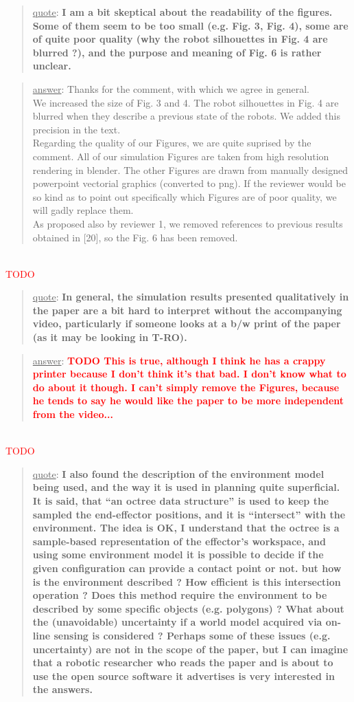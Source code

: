 \documentclass[a4paper]{article}
\newcommand{\ndone}[0]{\textcolor{red}{TODO}}
\newcommand\quot[1]{\begin{quote} \underline{quote}: \textbf{#1}\end{quote}}
\newcommand\as[1]{\begin{quote} \underline{answer}: {#1}\end{quote} \leavevmode \\ }
\begin{document}
\quot{I am a bit skeptical about the readability of the figures. Some of them seem to be too small (e.g. Fig. 3, Fig. 4), some are of quite poor quality (why the robot silhouettes in Fig. 4 are blurred ?), and the purpose and meaning of Fig. 6 is rather unclear.}
\as{Thanks for the comment, with which we agree in general.  \\We increased the size of Fig. 3 and 4. The robot silhouettes in Fig. 4 are blurred when they describe a previous state of the robots. We added this precision in the text. \\Regarding the quality of our Figures, we are quite suprised by the comment. All of our simulation Figures are taken from high resolution rendering in blender. The other Figures are drawn from manually designed powerpoint vectorial graphics (converted to png). If the reviewer would be so kind as to point out specifically which Figures are of poor quality, we will gadly replace them.\\ As proposed also by reviewer 1, we removed references to previous results obtained in [20], so the Fig. 6 has been removed.}\ndone

\quot{In general, the simulation results presented qualitatively in the paper are a bit hard to interpret without the accompanying video, particularly if someone looks at a b/w print of the paper (as it may be looking in T-RO).}
\as{\textbf{\textcolor{red}{TODO This is true, although I think he has a crappy printer because I don't think it's that bad. I don't know what to do about it though. I can't simply remove the Figures,
because he tends to say he would like the paper to be more independent from the video...}}}\ndone


\quot{ I also found the description of the environment model being
used,
and the way it is used in planning quite superficial. It is said, that
``an octree data structure'' is used to keep the sampled the
end-effector positions, and it is ``intersect'' with the environment.
The idea is OK, I understand that the octree is a sample-based
representation of the effector's workspace, and using some environment
model it is possible to decide if the given configuration can provide a
contact point or not. but how is the environment described ? How
efficient is this intersection operation ? Does this method require the
environment to be described by some specific objects (e.g. polygons) ?
What about the (unavoidable) uncertainty if a world model acquired via
on-line sensing is considered ? Perhaps some of these issues (e.g.
uncertainty) are not in the scope of the paper, but I can imagine that
a robotic researcher who reads the paper and is about to use the open
source software it advertises is very interested in the answers.}
\end{document}
